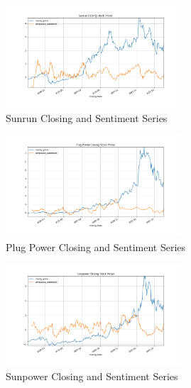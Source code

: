 \documentclass[sigconf, nonacm]{acmart}
\begin{document}
\begin{figure}[H]
  \centering
  \includegraphics[width=\linewidth, height =1.5in]{sentiment_time_series/Sunrun Closing Stock Prices_closing_price_compound_sentiment.png}
  \caption{Sunrun Closing and Sentiment Series}
\end{figure}

\begin{figure}[H]
  \centering
  \includegraphics[width=\linewidth, height =1.5in]{sentiment_time_series/Plug Power Closing Stock Prices_closing_price_compound_sentiment.png}
  \caption{Plug Power Closing and Sentiment Series}
\end{figure}

\begin{figure}[H]
  \centering
  \includegraphics[width=\linewidth, height =1.5in]{sentiment_time_series/Sunpower Closing Stock Prices_closing_price_compound_sentiment.png}
  \caption{Sunpower Closing and Sentiment Series}
\end{figure}
\end{document}
